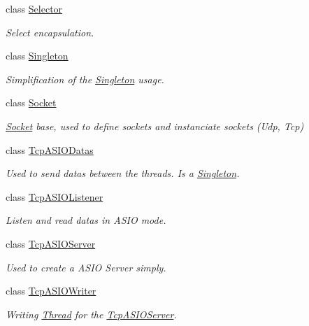 \begin{DoxyCompactItemize}
class \hyperlink{classmognetwork_1_1_selector}{Selector}
\begin{DoxyCompactList}\small\item\em Select encapsulation. \end{DoxyCompactList}\item 
class \hyperlink{classmognetwork_1_1_singleton}{Singleton}
\begin{DoxyCompactList}\small\item\em Simplification of the \hyperlink{classmognetwork_1_1_singleton}{Singleton} usage. \end{DoxyCompactList}\item 
class \hyperlink{classmognetwork_1_1_socket}{Socket}
\begin{DoxyCompactList}\small\item\em \hyperlink{classmognetwork_1_1_socket}{Socket} base, used to define sockets and instanciate sockets (Udp, Tcp) \end{DoxyCompactList}\item 
class \hyperlink{classmognetwork_1_1_tcp_a_s_i_o_datas}{Tcp\-A\-S\-I\-O\-Datas}
\begin{DoxyCompactList}\small\item\em Used to send datas between the threads. Is a \hyperlink{classmognetwork_1_1_singleton}{Singleton}. \end{DoxyCompactList}\item 
class \hyperlink{classmognetwork_1_1_tcp_a_s_i_o_listener}{Tcp\-A\-S\-I\-O\-Listener}
\begin{DoxyCompactList}\small\item\em Listen and read datas in A\-S\-I\-O mode. \end{DoxyCompactList}\item 
class \hyperlink{classmognetwork_1_1_tcp_a_s_i_o_server}{Tcp\-A\-S\-I\-O\-Server}
\begin{DoxyCompactList}\small\item\em Used to create a A\-S\-I\-O Server simply. \end{DoxyCompactList}\item 
class \hyperlink{classmognetwork_1_1_tcp_a_s_i_o_writer}{Tcp\-A\-S\-I\-O\-Writer}
\begin{DoxyCompactList}\small\item\em Writing \hyperlink{classmognetwork_1_1_thread}{Thread} for the \hyperlink{classmognetwork_1_1_tcp_a_s_i_o_server}{Tcp\-A\-S\-I\-O\-Server}. \end{DoxyCompactList}\item 

\end{DoxyCompactItemize}
